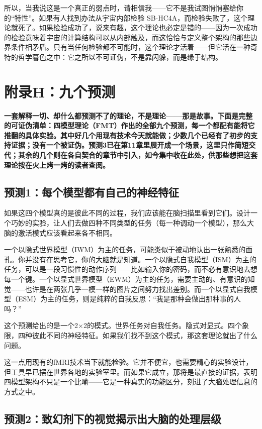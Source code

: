 \documentclass[11pt, twoside, openright]{book}
\begin{document}
所以，当我说这是一个真正的弱点时，请相信我------它不是我试图悄悄塞给你的“特性”。如果有人找到办法从宇宙内部检验 SB-HC4A，而检验失败了，这个理论就死了。如果检验成功了，说来有趣，这个理论也必定是错的------因为一次成功的检验意味着宇宙的计算结构可以从内部触及，而这恰恰与定义整个架构的那些边界条件相矛盾。只有当任何检验都不可能时，这个理论才活着------但它活在一种奇特的哲学暮色之中：它之所以不可证伪，不是靠闪躲，而是缘于结构。


\chapter*{附录H：九个预测}

\textbf{一套解释一切、却什么都预测不了的理论，不是理论------那是故事。下面是完整的可证伪清单：四模型理论（FMT）作出的全部九个预测，每一个都配有能将它推翻的具体实验。其中好几个用现有技术今天就能做；少数几个已经有了初步的支持证据；没有一个被证伪。预测3已在第11章里展开成一个场景，这里只作简短交代；其余的几个则在各自契合的章节中引入，如今集中收在此处，供那些想把这套理论按在火上烤一烤的读者查阅。}

\section*{预测1：每个模型都有自己的神经特征}

如果这四个模型真的是彼此不同的过程，我们应该能在脑扫描里看到它们。设计一个巧妙的实验，让人们去做四种不同类型的任务（每一种调动一个模型），那么大脑的激活模式应该看起来各不相同。

一个以隐式世界模型（IWM）为主的任务，可能类似于被动地认出一张熟悉的面孔。你并没有在思考它，你的大脑就是知道。一个以隐式自我模型（ISM）为主的任务，可以是一段习惯性的动作序列------比如输入你的密码，而不必有意识地去想每一个键。一个以显式世界模型（EWM）为主的任务，需要主动的、有意识的知觉------也许是在两张几乎一模一样的图片之间努力找出差别。而一个以显式自我模型（ESM）为主的任务，则是纯粹的自我反思：“我是那种会做出那种事的人吗？”

这个预测给出的是一个2×2的模式。世界任务对自我任务。隐式对显式。四个象限，四种彼此不同的神经特征。如果我们找不到这个模式，那这套理论就出了什么问题。

这一点用现有的fMRI技术当下就能检验。它并不便宜，也需要精心的实验设计，但工具早已摆在世界各地的实验室里。而如果它成立，那将是最直接的证据，表明四模型架构不只是一个比喻------它是一种真实的功能区分，刻进了大脑处理信息的方式之中。

\section*{预测2：致幻剂下的视觉揭示出大脑的处理层级}
\end{document}
